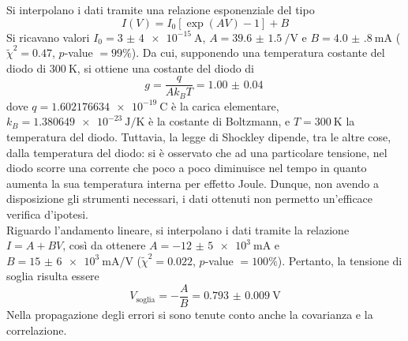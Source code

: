 \documentclass[a4paper]{article}
\begin{document}
Si interpolano i dati tramite una relazione esponenziale del tipo
\[
I(V)=I_0 \left[ \exp\left( A V \right) -1 \right] + B
\] 
Si ricavano valori $I_0=\SI{3(4)e-15}{\A}$, $A=\SI{39.6(15)}{\per\volt}$ e $B=\SI{4.0(8)}{\mA}$ ($\widetilde{\chi}^2=0.47$, $p$-value $=99\%$). Da cui, supponendo una temperatura costante del diodo di $\SI{300}{\K}$, si ottiene una costante del diodo di
\[
g=\frac{q}{Ak_BT}=\SI{1.00(4)}{}
\] 
dove $q=\SI{1.602176634e-19}{\coulomb}$ è la carica elementare, $k_B=\SI{1.380649e-23}{\J\per\K}$ è la costante di Boltzmann, e $T=\SI{300}{\K}$ la temperatura del diodo. Tuttavia, la legge di Shockley dipende, tra le altre cose, dalla temperatura del diodo: si è osservato che ad una particolare tensione, nel diodo scorre una corrente che poco a poco diminuisce nel tempo in quanto aumenta la sua temperatura interna per effetto Joule. Dunque, non avendo a disposizione gli strumenti necessari, i dati ottenuti non permetto un'efficace verifica d'ipotesi.\\

Riguardo l'andamento lineare, si interpolano i dati tramite la relazione $I=A+BV$, così da ottenere $A=\SI{-12(5)e+3}{\mA}$ e $B=\SI{15(6)e+3}{\mA\per\V}$ ($\widetilde{\chi}^2=0.022$, $p$-value $=100\%$). Pertanto, la tensione di soglia risulta essere
\[
V_\text{soglia} = -\frac{A}{B}=\SI{0.793(9)}{\V}
\] 
Nella propagazione degli errori si sono tenute conto anche la covarianza e la correlazione.
\end{document}
